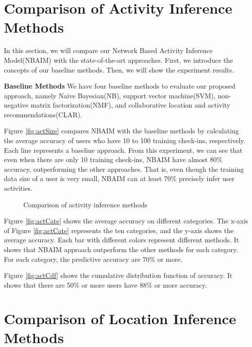 \section{Comparison of Activity Inference Methods}
\label{sec:5-3}
In this section, we will compare our Network Based Activity Inference Model(NBAIM) with the state-of-the-art approaches. First, we introduce the concepts of our baseline methods. Then, we will show the experiment results.

{\bf Baseline Methods}
We have four baseline methods to evaluate our proposed approach, namely Naive Bayesian(NB), support vector machine(SVM), non-negative matrix factorization(NMF), and collaborative location and activity recommendations\cite{10_WWW_Zheng}(CLAR). 



Figure \ref{fig:actSize} compares NBAIM with the baseline methods by calculating the average accuracy of users who have 10 to 100 training check-ins, respectively. Each line represents a baseline approach. From this experiment, we can see that even when there are only 10 training check-ins, NBAIM have almost 80\% accuracy, outperforming the other approaches. That is, even though the training data size of a user is very small, NBAIM can at least 70\% precisely infer user activities.

\begin{figure}
\centering
{}
\caption{Comparison of activity inference methods}
\end{figure}

Figure \ref{fig:actCate} shows the average accuracy on different categories. The x-axis of Figure \ref{fig:actCate} represents the ten categories, and the y-axis shows the average accuracy. Each bar with different colors represent different methods. It shows that NBAIM approach outperform the other methods for each category. For each category, the predictive accuracy are 70\% or more.


Figure \ref{fig:actCdf} shows the cumulative distribution function of accuracy. It shows that there are 50\% or more users have 88\% or more accuracy.

\section{Comparison of Location Inference Methods}
\label{sec:5-4}

